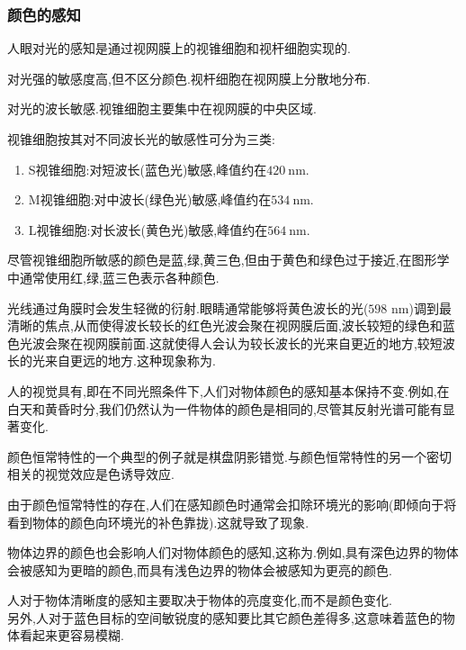 \documentclass{ctexart}
\begin{document}
\subsubsection{颜色的感知}
人眼对光的感知是通过视网膜上的视锥细胞和视杆细胞实现的.
\begin{theorem}[视杆细胞的作用与分布]
    对光强的敏感度高,但不区分颜色.视杆细胞在视网膜上分散地分布.
\end{theorem}
\begin{theorem}[视锥细胞的作用与分布]
    对光的波长敏感.视锥细胞主要集中在视网膜的中央区域.
\end{theorem}
\begin{theorem}[视锥细胞的分类]
    视锥细胞按其对不同波长光的敏感性可分为三类:
    \begin{enumerate}[label=\tbf{\arabic*.},topsep=0pt,parsep=0pt,itemsep=0pt,partopsep=0pt]
        \item S视锥细胞:对短波长(蓝色光)敏感,峰值约在$420\ \text{nm}$.
        \item M视锥细胞:对中波长(绿色光)敏感,峰值约在$534\ \text{nm}$.
        \item L视锥细胞:对长波长(黄色光)敏感,峰值约在$564\ \text{nm}$.
    \end{enumerate}
\end{theorem}
尽管视锥细胞所敏感的颜色是蓝,绿,黄三色,但由于黄色和绿色过于接近,在图形学中通常使用红,绿,蓝三色表示各种颜色.
\begin{theorem}[色彩立体效应]
    光线通过角膜时会发生轻微的衍射.眼睛通常能够将黄色波长的光($598\text{ nm}$)调到最清晰的焦点,从而使得波长较长的红色光波会聚在视网膜后面,波长较短的绿色和蓝色光波会聚在视网膜前面.这就使得人会认为较长波长的光来自更近的地方,较短波长的光来自更远的地方.这种现象称为.
\end{theorem}
\begin{theorem}[颜色恒常特性]
    人的视觉具有,即在不同光照条件下,人们对物体颜色的感知基本保持不变.例如,在白天和黄昏时分,我们仍然认为一件物体的颜色是相同的,尽管其反射光谱可能有显著变化.
\end{theorem}
颜色恒常特性的一个典型的例子就是棋盘阴影错觉.与颜色恒常特性的另一个密切相关的视觉效应是色诱导效应.
\begin{theorem}[色诱导]
    由于颜色恒常特性的存在,人们在感知颜色时通常会扣除环境光的影响(即倾向于将看到物体的颜色向环境光的补色靠拢).这就导致了现象.
\end{theorem}
\begin{theorem}[边界效应]
    物体边界的颜色也会影响人们对物体颜色的感知,这称为.例如,具有深色边界的物体会被感知为更暗的颜色,而具有浅色边界的物体会被感知为更亮的颜色.
\end{theorem}
\begin{theorem}[色彩和视觉敏锐度]
    人对于物体清晰度的感知主要取决于物体的亮度变化,而不是颜色变化.\\
    另外,人对于蓝色目标的空间敏锐度的感知要比其它颜色差得多,这意味着蓝色的物体看起来更容易模糊.
\end{theorem}
\end{document}
